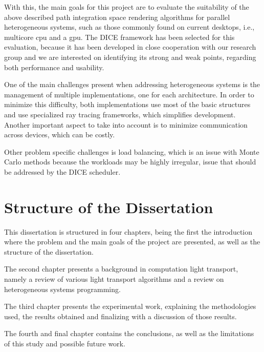 With this, the main goals for this project are to evaluate the suitability of the above described path integration space rendering algorithms for parallel heterogeneous systems, such as those commonly found on current desktops, i.e., multicore \gls{cpu} and a \gls{gpu}. The DICE framework has been selected for this evaluation, because it has been developed in close cooperation with our research group and we are interested on identifying its strong and weak points, regarding both performance and usability.

One of the main challenges present when addressing heterogeneous systems is the management of multiple implementations, one for each architecture. In order to minimize this difficulty, both implementations use most of the basic structures and use specialized ray tracing frameworks, which simplifies development. Another important aspect to take into account is to minimize communication across devices, which can be costly.

Other problem specific challenges is load balancing, which is an issue with Monte Carlo methods because the workloads may be highly irregular, issue that should be addressed by the DICE scheduler.

\section{Structure of the Dissertation}

This dissertation is structured in four chapters, being the first the introduction where the problem and the main goals of the project are presented, as well as the structure of the dissertation.

The second chapter presents a background in computation light transport, namely a review of various light transport algorithms and a review on heterogeneous systems programming.

The third chapter presents the experimental work, explaining the methodologies used, the results obtained and finalizing with a discussion of those results.

The fourth and final chapter contains the conclusions, as well as the limitations of this study and possible future work.

